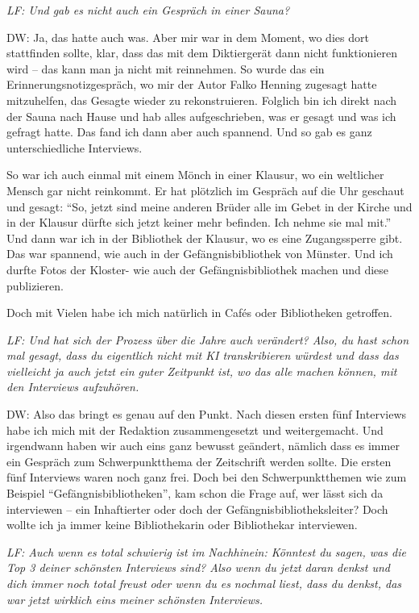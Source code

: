 \documentclass[a4paper,
fontsize=11pt,
oneside,
numbers=noperiodatend,
parskip=half-,
bibliography=totoc,
final
]{scrartcl}
\begin{document}
\emph{LF: Und gab es nicht auch ein Gespräch in einer Sauna?}

DW: Ja, das hatte auch was. Aber mir war in dem Moment, wo dies dort
stattfinden sollte, klar, dass das mit dem Diktiergerät dann nicht
funktionieren wird -- das kann man ja nicht mit reinnehmen. So wurde das
ein Erinnerungsnotizgespräch, wo mir der Autor Falko Henning zugesagt
hatte mitzuhelfen, das Gesagte wieder zu rekonstruieren. Folglich bin
ich direkt nach der Sauna nach Hause und hab alles aufgeschrieben, was
er gesagt und was ich gefragt hatte. Das fand ich dann aber auch
spannend. Und so gab es ganz unterschiedliche Interviews.

So war ich auch einmal mit einem Mönch in einer Klausur, wo ein
weltlicher Mensch gar nicht reinkommt. Er hat plötzlich im Gespräch auf
die Uhr geschaut und gesagt: \enquote{So, jetzt sind meine anderen
Brüder alle im Gebet in der Kirche und in der Klausur dürfte sich jetzt
keiner mehr befinden. Ich nehme sie mal mit.} Und dann war ich in der
Bibliothek der Klausur, wo es eine Zugangssperre gibt. Das war spannend,
wie auch in der Gefängnisbibliothek von Münster. Und ich durfte Fotos
der Kloster- wie auch der Gefängnisbibliothek machen und diese
publizieren.

Doch mit Vielen habe ich mich natürlich in Cafés oder Bibliotheken
getroffen.

\emph{LF: Und hat sich der Prozess über die Jahre auch verändert? Also,
du hast schon mal gesagt, dass du eigentlich nicht mit KI transkribieren
würdest und dass das vielleicht ja auch jetzt ein guter Zeitpunkt ist,
wo das alle machen können, mit den Interviews aufzuhören.}

DW: Also das bringt es genau auf den Punkt. Nach diesen ersten fünf
Interviews habe ich mich mit der Redaktion zusammengesetzt und
weitergemacht. Und irgendwann haben wir auch eins ganz bewusst geändert,
nämlich dass es immer ein Gespräch zum Schwerpunktthema der Zeitschrift
werden sollte. Die ersten fünf Interviews waren noch ganz frei. Doch bei
den Schwerpunktthemen wie zum Beispiel \enquote{Gefängnisbibliotheken},
kam schon die Frage auf, wer lässt sich da interviewen -- ein
Inhaftierter oder doch der Gefängnisbibliotheksleiter? Doch wollte ich
ja immer keine Bibliothekarin oder Bibliothekar interviewen.

\emph{LF: Auch wenn es total schwierig ist im Nachhinein: Könntest du
sagen, was die Top 3 deiner schönsten Interviews sind? Also wenn du
jetzt daran denkst und dich immer noch total freust oder wenn du es
nochmal liest, dass du denkst, das war jetzt wirklich eins meiner
schönsten Interviews.}
\end{document}
